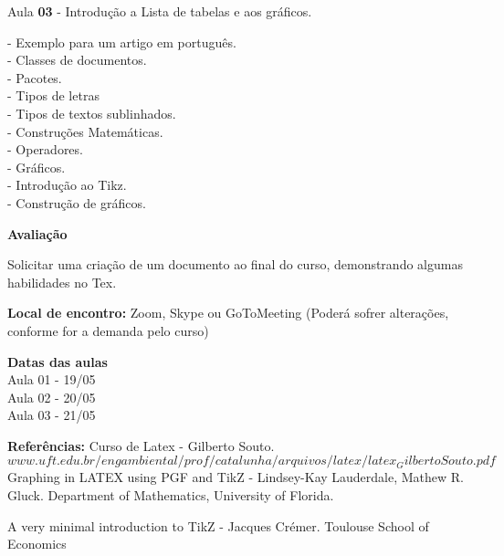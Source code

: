 \documentclass[a4paper, 12pt]{article}
\begin{document}
\begin{flushleft}
Aula \textbf{03} - Introdução a Lista de tabelas e aos gráficos. \singlespacing

  - Exemplo para um artigo em português.
  \\
  - Classes de documentos.
  \\
  - Pacotes.
  \\
  - Tipos de letras
  \\
  - Tipos de textos sublinhados.
  \\
  - Construções Matemáticas.
  \\
  - Operadores.
  \\
  - Gráficos.
  \\
  - Introdução ao Tikz.
  \\
  - Construção de gráficos. \singlespacing
  
\textbf{Avaliação} 

Solicitar uma criação de um documento ao final do curso, demonstrando algumas habilidades no Tex. \singlespacing


\textbf{Local de encontro:}
Zoom, Skype ou GoToMeeting (Poderá sofrer alterações, conforme for a demanda pelo curso) \singlespacing

\textbf{Datas das aulas}
\\
Aula 01 - 19/05
\\
Aula 02 - 20/05
\\
Aula 03 - 21/05 \singlespacing
  \begin{center}
 
  
  \textbf{Referências:} \singlespacing
  Curso de Latex - Gilberto Souto.
\\
 $www.uft.edu.br/engambiental/prof/catalunha/arquivos/latex/latex_GilbertoSouto.pdf$  \singlespacing
  Graphing in LATEX using PGF and TikZ - Lindsey-Kay Lauderdale, Mathew R. Gluck. Department of Mathematics, University of Florida. \singlespacing
 
  A very minimal introduction to TikZ - Jacques Crémer. Toulouse School of Economics \singlespacing
  \end{center}
\end{flushleft}
\end{document}
